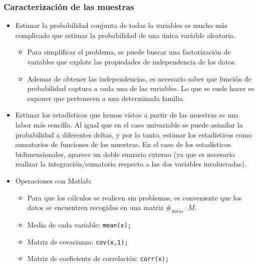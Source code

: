\begin{frame}
\frametitle{Caracterización de las muestras}

\vspace{-0.2cm}

\footnotesize
\begin{itemize}
\item Estimar la probabilidad conjunta de todas la variables es mucho más complicado que estimar la probabilidad de una única variable aleatoria. 
\begin{itemize}
\footnotesize
\item Para simplificar el problema, se puede buscar una factorización de variables que explote las propiedades de independencia de los datos. 
\item Ademas de obtener las independencias, es necesario saber que función de probabilidad captura a cada una de las variables. Lo que se suele hacer es suponer que pertenecen a una determinada familia.
\end{itemize}
\item Estimar los estadísticos que hemos vistos a partir de las muestras es una labor más sencilla. Al igual que en el caso univariable se puede asimilar la probabilidad a diferentes deltas, y por lo tanto, estimar los estadísticos como sumatorios de funciones de las muestras. En el caso de los estadísticos bidimensionales, aparece un doble sumario externo (ya que es necesario realizar la integración/sumatorio respecto a las dos variables involucradas).

\item Operaciones con Matlab:

\begin{itemize}

\footnotesize
\item Para que los cálculos se realicen sin problemas, es conveniente que los datos se encuentren recogidos en una matriz $\#_{datos}\cdot M$.
\item Media de cada variable: \color{blue}\texttt{mean(x);}\color{black}
\item Matriz de covarianza: \color{blue}\texttt{cov(x,1);}\color{black}
\item Matriz de coeficiente de correlación: \color{blue}\texttt{corr(x);}\color{black}
\end{itemize}
\end{itemize}
\end{frame}


